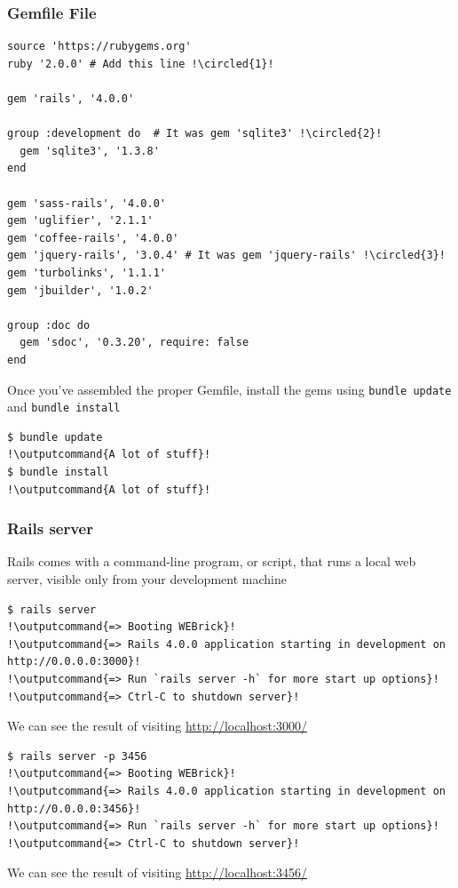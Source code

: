 \documentclass{beamer}
\newcommand*\circled[1]{\tikz[baseline=(char.base)]{
            \node[shape=circle,draw,inner sep=2pt] (char) {#1};}}
\newcommand{\commandinline}[1]{\lstinline[basicstyle=\small\lstfontfamily]{#1}}
\newcommand{\outputcommand}[1]{\color{darkgreen}{#1}}
\begin{document}
\begin{frame}
\frametitle{Gemfile File}
\lstset{language=Ruby, style=eclipse}
\begin{lstlisting}[caption=A new Gemfile with an explicit version for each Ruby gem, escapechar=!]
source 'https://rubygems.org'
ruby '2.0.0' # Add this line !\circled{1}!

gem 'rails', '4.0.0'

group :development do  # It was gem 'sqlite3' !\circled{2}!
  gem 'sqlite3', '1.3.8'
end

gem 'sass-rails', '4.0.0'
gem 'uglifier', '2.1.1'
gem 'coffee-rails', '4.0.0'
gem 'jquery-rails', '3.0.4' # It was gem 'jquery-rails' !\circled{3}!
gem 'turbolinks', '1.1.1'
gem 'jbuilder', '1.0.2'

group :doc do
  gem 'sdoc', '0.3.20', require: false
end
\end{lstlisting}
Once you’ve assembled the proper Gemfile, install the gems using \commandinline{bundle update} and \commandinline{bundle install}
\lstset{language=shell}
\begin{lstlisting}[escapechar=!]
$ bundle update
!\outputcommand{A lot of stuff}!
$ bundle install
!\outputcommand{A lot of stuff}!
\end{lstlisting}
\end{frame}
\begin{frame}[fragile]
\frametitle{Rails server}
Rails comes with a command-line program, or script, that runs a local web server, visible only from your development machine
\lstset{language=shell}
\begin{lstlisting}[escapechar=!]
$ rails server
!\outputcommand{=> Booting WEBrick}!
!\outputcommand{=> Rails 4.0.0 application starting in development on http://0.0.0.0:3000}!
!\outputcommand{=> Run `rails server -h` for more start up options}!
!\outputcommand{=> Ctrl-C to shutdown server}!
\end{lstlisting}
We can see the result of visiting \url{http://localhost:3000/}
\begin{lstlisting}[escapechar=!]
$ rails server -p 3456
!\outputcommand{=> Booting WEBrick}!
!\outputcommand{=> Rails 4.0.0 application starting in development on http://0.0.0.0:3456}!
!\outputcommand{=> Run `rails server -h` for more start up options}!
!\outputcommand{=> Ctrl-C to shutdown server}!
\end{lstlisting}
We can see the result of visiting \url{http://localhost:3456/}
\end{frame}
\end{document}
